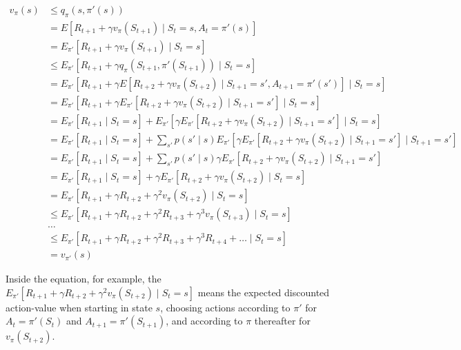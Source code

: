 \documentclass{article}
\begin{document}
\begin{equation*}
\begin{split}
v_{\pi}(s) 
& \leq q_{\pi}(s, \pi'(s)) \\
& = E[R_{t + 1} + \gamma v_{\pi}(S_{t + 1}) \mid S_t = s, A_t = \pi'(s)] \\
& = E_{\pi'}[R_{t + 1} + \gamma v_{\pi}(S_{t + 1}) \mid S_t = s] \\
& \leq E_{\pi'}[R_{t + 1} + \gamma q_{\pi}(S_{t + 1}, \pi'(S_{t + 1})) \mid S_t = s] \\
& = E_{\pi'}[R_{t + 1} + \gamma E[R_{t + 2} + \gamma v_{\pi}(S_{t + 2}) \mid S_{t + 1} = s', A_{t + 1} = \pi'(s')] \mid S_t = s] \\
& = E_{\pi'}[R_{t + 1} + \gamma E_{\pi'}[R_{t + 2} + \gamma v_{\pi}(S_{t + 2}) \mid S_{t + 1} = s'] \mid S_t = s] \\
& = E_{\pi'}[R_{t + 1} \mid S_t = s] + E_{\pi'}[\gamma E_{\pi'}[R_{t + 2} + \gamma v_{\pi}(S_{t + 2}) \mid S_{t + 1} = s'] \mid S_t = s] \\
& = E_{\pi'}[R_{t + 1} \mid S_t = s] + \sum_{s'} p(s' \mid s) E_{\pi'}[\gamma E_{\pi'}[R_{t + 2} + \gamma v_{\pi}(S_{t + 2}) \mid S_{t + 1} = s'] \mid S_{t + 1} = s'] \\
& = E_{\pi'}[R_{t + 1} \mid S_t = s] + \sum_{s'} p(s' \mid s) \gamma E_{\pi'}[R_{t + 2} + \gamma v_{\pi}(S_{t + 2}) \mid S_{t + 1} = s'] \\
& = E_{\pi'}[R_{t + 1} \mid S_t = s] + \gamma E_{\pi'}[R_{t + 2} + \gamma v_{\pi}(S_{t + 2}) \mid S_t = s] \\
& = E_{\pi'}[R_{t + 1} + \gamma R_{t + 2} + \gamma^2 v_{\pi}(S_{t + 2}) \mid S_t = s] \\
& \leq E_{\pi'}[R_{t + 1} + \gamma R_{t + 2} + \gamma^2 R_{t + 3} + \gamma^3 v_{\pi}(S_{t + 3}) \mid S_t = s] \\
& \dots \\
& \leq E_{\pi'}[R_{t + 1} + \gamma R_{t + 2} + \gamma^2 R_{t + 3} + \gamma^3 R_{t + 4} + \dots \mid S_t = s] \\
& = v_{\pi'}(s)
\end{split}
\end{equation*}

Inside the equation, for example, the \(E_{\pi'}[R_{t + 1} + \gamma R_{t + 2} + \gamma^2 v_{\pi}(S_{t + 2}) \mid S_t = s]\) means the expected discounted action-value when starting in state \(s\), 
choosing actions according to \(\pi'\) for \(A_t = \pi'(S_t)\) and \(A_{t + 1} = \pi'(S_{t + 1})\), and according to \(\pi\) thereafter for \(v_{\pi}(S_{t + 2})\).
\end{document}
